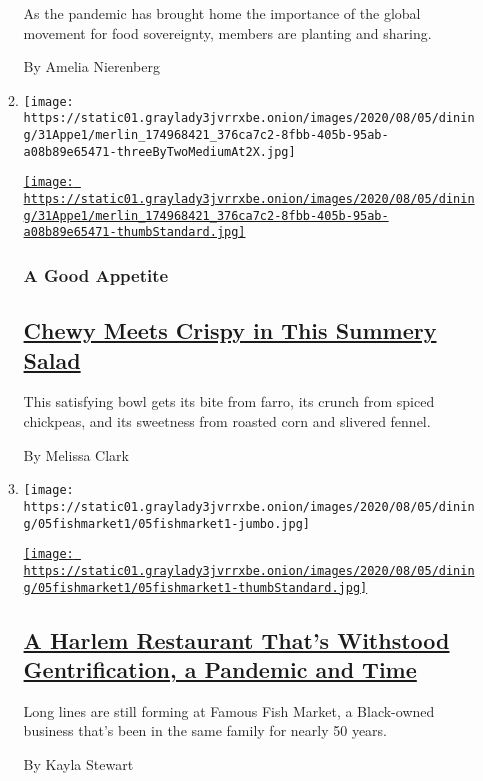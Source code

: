 \begin{enumerate}
\begin{enumerate}
    As the pandemic has brought home the importance of the global
    movement for food sovereignty, members are planting and sharing.

    By Amelia Nierenberg
  \item
    \texttt{[image: https://static01.graylady3jvrrxbe.onion/images/2020/08/05/dining/31Appe1/merlin\_174968421\_376ca7c2-8fbb-405b-95ab-a08b89e65471-threeByTwoMediumAt2X.jpg]}

    \href{/2020/07/31/dining/farro-corn-chickpea-salad-recipe.html}{\texttt{[image: https://static01.graylady3jvrrxbe.onion/images/2020/08/05/dining/31Appe1/merlin\_174968421\_376ca7c2-8fbb-405b-95ab-a08b89e65471-thumbStandard.jpg]}}

    \hypertarget{a-good-appetite}{%
    \subsubsection{A Good Appetite}\label{a-good-appetite}}

    \hypertarget{chewy-meets-crispy-in-this-summery-salad}{%
    \subsection{\texorpdfstring{\href{/2020/07/31/dining/farro-corn-chickpea-salad-recipe.html}{Chewy
    Meets Crispy in This Summery
    Salad}}{Chewy Meets Crispy in This Summery Salad}}\label{chewy-meets-crispy-in-this-summery-salad}}

    This satisfying bowl gets its bite from farro, its crunch from
    spiced chickpeas, and its sweetness from roasted corn and slivered
    fennel.

    By Melissa Clark
  \item
    \texttt{[image: https://static01.graylady3jvrrxbe.onion/images/2020/08/05/dining/05fishmarket1/05fishmarket1-jumbo.jpg]}

    \href{/2020/07/30/dining/famous-fish-market-harlem.html}{\texttt{[image: https://static01.graylady3jvrrxbe.onion/images/2020/08/05/dining/05fishmarket1/05fishmarket1-thumbStandard.jpg]}}

    \hypertarget{a-harlem-restaurant-thats-withstood-gentrification-a-pandemic-and-time}{%
    \subsection{\texorpdfstring{\href{/2020/07/30/dining/famous-fish-market-harlem.html}{A
    Harlem Restaurant That's Withstood Gentrification, a Pandemic and
    Time}}{A Harlem Restaurant That's Withstood Gentrification, a Pandemic and Time}}\label{a-harlem-restaurant-thats-withstood-gentrification-a-pandemic-and-time}}

    Long lines are still forming at Famous Fish Market, a Black-owned
    business that's been in the same family for nearly 50 years.

    By Kayla Stewart
  \end{enumerate}
\end{enumerate}

